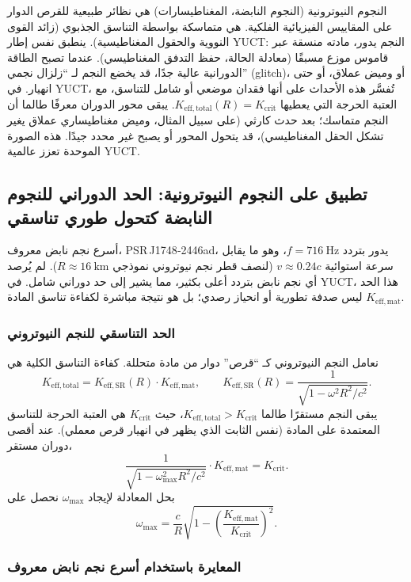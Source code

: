 \documentclass[12pt,a4paper]{article}
\newcommand{\Kefftot}{K_{\mathrm{eff,total}}}
\newcommand{\Kcrit}{K_{\mathrm{crit}}}
\begin{document}
	النجوم النيوترونية (النجوم النابضة، المغناطيسارات) هي نظائر طبيعية للقرص الدوار على المقاييس الفيزيائية الفلكية. هي متماسكة بواسطة التناسق الجذبوي (زائد القوى النووية والحقول المغناطيسية). ينطبق نفس إطار YUCT: النجم يدور، مادته منسقة عبر قاموس موزع مسبقًا (معادلة الحالة، حفظ التدفق المغناطيسي). عندما تصبح الطاقة الدورانية عالية جدًا، قد يخضع النجم لـ ``زلزال نجمي'' (glitch)، أو وميض عملاق، أو حتى انهيار. في YUCT، تُفسَّر هذه الأحداث على أنها فقدان موضعي أو شامل للتناسق، مع العتبة الحرجة التي يعطيها \(\Kefftot(R) = \Kcrit\). يبقى محور الدوران معرفًا طالما أن النجم متماسك؛ بعد حدث كارثي (على سبيل المثال، وميض مغناطيساري عملاق يغير تشكل الحقل المغناطيسي)، قد يتحول المحور أو يصبح غير محدد جيدًا. هذه الصورة الموحدة تعزز عالمية YUCT.
	
	\subsection{تطبيق على النجوم النيوترونية: الحد الدوراني للنجوم النابضة كتحول طوري تناسقي}
	
	أسرع نجم نابض معروف، PSR J1748‑2446ad، يدور بتردد \(f = 716\ \text{Hz}\)، وهو ما يقابل سرعة استوائية \(v \approx 0.24c\) (لنصف قطر نجم نيوتروني نموذجي \(R\approx 16\ \text{km}\)). لم يُرصد أي نجم نابض بتردد أعلى بكثير، مما يشير إلى حد دوراني شامل. في YUCT، هذا الحد ليس صدفة تطورية أو انحياز رصدي؛ بل هو نتيجة مباشرة لكفاءة تناسق المادة \(K_{\mathrm{eff,mat}}\).
	
	\subsubsection{الحد التناسقي للنجم النيوتروني}
	
	نعامل النجم النيوتروني كـ ``قرص'' دوار من مادة متحللة. كفاءة التناسق الكلية هي
	\[
	K_{\mathrm{eff,total}} = K_{\mathrm{eff,SR}}(R) \cdot K_{\mathrm{eff,mat}},
	\qquad
	K_{\mathrm{eff,SR}}(R) = \frac{1}{\sqrt{1 - \omega^2 R^2/c^2}}.
	\]
	يبقى النجم مستقرًا طالما \(K_{\mathrm{eff,total}} > K_{\mathrm{crit}}\)، حيث \(K_{\mathrm{crit}}\) هي العتبة الحرجة للتناسق المعتمدة على المادة (نفس الثابت الذي يظهر في انهيار قرص معملي). عند أقصى دوران مستقر،
	\[
	\frac{1}{\sqrt{1 - \omega_{\max}^2 R^2/c^2}} \cdot K_{\mathrm{eff,mat}} = K_{\mathrm{crit}}.
	\]
	بحل المعادلة لإيجاد \(\omega_{\max}\) نحصل على
	\[
	\omega_{\max} = \frac{c}{R}\sqrt{1 - \left(\frac{K_{\mathrm{eff,mat}}}{K_{\mathrm{crit}}}\right)^2}.
	\]
	
	\subsubsection{المعايرة باستخدام أسرع نجم نابض معروف}
	
\end{document}
